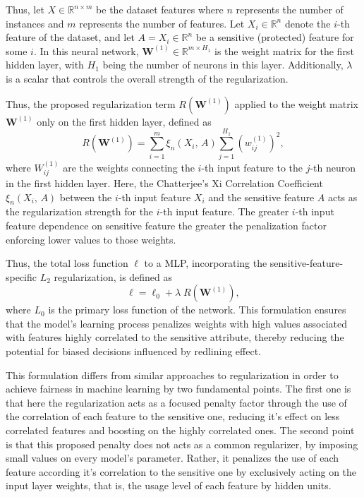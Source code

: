 Thus, let $X \in \mathbb{R}^{n \times m}$ be the dataset features where $n$ represents the number of instances and $m$ represents the number of features. Let $X_i \in \mathbb{R}^n$ denote the $i$-th feature of the dataset, and let $A = X_i \in \mathbb{R}^n$ be a sensitive (protected) feature for some $i$. In this neural network, $\mathbf{W}^{(1)} \in \mathbb{R}^{m \times H_1}$ is the weight matrix for the first hidden layer, with $H_1$ being the number of neurons in this layer. Additionally, $\lambda$ is a scalar that controls the overall strength of the regularization.

Thus, the proposed regularization term $R(\mathbf{W}^{(1)})$ applied to the weight matrix $\mathbf{W}^{(1)}$ only on the first hidden layer, defined as 
\begin{equation}\label{eq:xi_reg}
R(\mathbf{W}^{(1)}) = \sum_{i=1}^m \xi_n(X_i,\,A) \sum_{j=1}^{H_1} (w^{(1)}_{ij})^2,
\end{equation}
where $W^{(1)}_{ij}$ are the weights connecting the $i$-th input feature to the $j$-th neuron in the first hidden layer. Here, the Chatterjee's Xi Correlation Coefficient $\xi_n(X_i,\,A)$ between the $i$-th input feature $X_i$ and the sensitive feature $A$ acts as the regularization strength for the $i$-th input feature. The greater $i$-th input feature dependence on sensitive feature the greater the penalization factor enforcing lower values to those weights.

Thus, the total loss function $\ell$ to a MLP, incorporating the sensitive-feature-specific $L_2$ regularization, is defined as
\begin{equation}\label{eq:total_regularized_loss}
\ell = \ell_0 + \lambda \; R(\mathbf{W}^{(1)}),
\end{equation}
where $L_0$ is the primary loss function of the network. This formulation ensures that the model's learning process penalizes weights with high values associated with features highly correlated to the sensitive attribute, thereby reducing the potential for biased decisions influenced by redlining effect.

This formulation differs from similar approaches to regularization in order to achieve fairness in machine learning by two fundamental points.  The first one is that here the regularization acts as a focused penalty factor through the use of the correlation of each feature to the sensitive one, reducing it's effect on less correlated features and boosting on the highly correlated ones. The second point is that this proposed penalty does not acts as a common regularizer, by imposing small values on every model's parameter. Rather, it penalizes the use of each feature according it's correlation to the sensitive one by exclusively acting on the input layer weights, that is, the usage level of each feature by hidden units.

